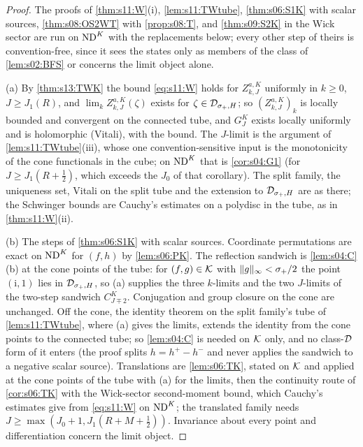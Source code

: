 \begin{proof}
The proofs of \cref{thm:s11:W}(i), \cref{lem:s11:TWtube}, \cref{thm:s06:S1K} with scalar sources, \cref{thm:s08:OS2WT} with \cref{prop:s08:T}, and \cref{thm:s09:S2K} in the Wick sector are run on $\mathrm{ND}^{K}$ with the replacements below; every other step of theirs is convention-free, since it sees the states only as members of the class of \cref{lem:s02:BFS} or concerns the limit object alone.

(a) By \cref{thm:s13:TWK} the bound \eqref{eq:s11:W} holds for $Z^{a,K}_{k,J}$ uniformly in $k\ge0$, $J\ge J_1(R)$, and $\lim_kZ^{a,K}_{k,J}(\zeta)$ exists for $\zeta\in\mathcal D_{\sigma_+,H}$; so $(Z^{a,K}_{k,J})_k$ is locally bounded and convergent on the connected tube, and $G^K_J$ exists locally uniformly and is holomorphic (Vitali), with the bound. The $J$-limit is the argument of \cref{lem:s11:TWtube}(iii), whose one convention-sensitive input is the monotonicity of the cone functionals in the cube; on $\mathrm{ND}^{K}$ that is \cref{cor:s04:G1} (for $J\ge J_1(R+\frac12)$, which exceeds the $J_0$ of that corollary). The split family, the uniqueness set, Vitali on the split tube and the extension to $\mathcal D_{\sigma_+,H}$ are as there; the Schwinger bounds are Cauchy's estimates on a polydisc in the tube, as in \cref{thm:s11:W}(ii).

(b) The steps of \cref{thm:s06:S1K} with scalar sources. Coordinate permutations are exact on $\mathrm{ND}^{K}$ for $(f,h)$ by \cref{lem:s06:PK}. The reflection sandwich is \cref{lem:s04:C}(b) at the cone points of the tube: for $(f,g)\in\mathcal K$ with $\lVert g\rVert_\infty<\sigma_+/2$ the point $(\mathrm i,1)$ lies in $\mathcal D_{\sigma_+,H}$, so (a) supplies the three $k$-limits and the two $J$-limits of the two-step sandwich $C^K_{J\mp2}$. Conjugation and group closure on the cone are unchanged. Off the cone, the identity theorem on the split family's tube of \cref{lem:s11:TWtube}, where (a) gives the limits, extends the identity from the cone points to the connected tube; so \cref{lem:s04:C} is needed on $\mathcal K$ only, and no class-$\mathcal D$ form of it enters (the proof splits $h=h^+-h^-$ and never applies the sandwich to a negative scalar source). Translations are \cref{lem:s06:TK}, stated on $\mathcal K$ and applied at the cone points of the tube with (a) for the limits, then the continuity route of \cref{cor:s06:TK} with the Wick-sector second-moment bound, which Cauchy's estimates give from \eqref{eq:s11:W} on $\mathrm{ND}^{K}$; the translated family needs $J\ge\max(J_0+1,J_1(R+M+\frac12))$. Invariance about every point and differentiation concern the limit object.


\end{proof}
